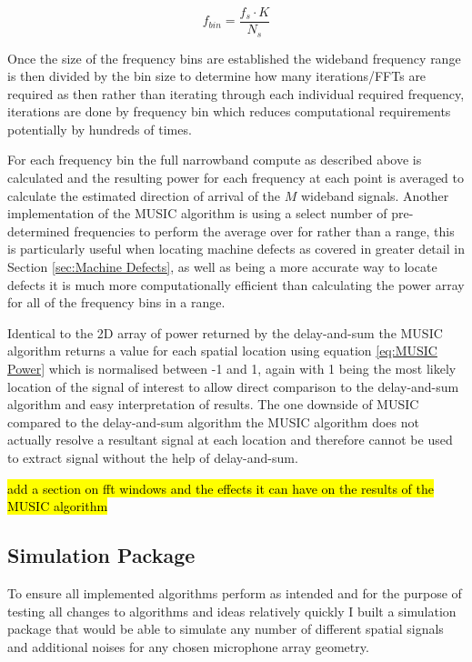 \documentclass{UoNMCHA}
\numberwithin{equation}{section}
\begin{document}
    \begin{equation}
        f_{bin} =\frac{f_s \cdot K}{N_s}
    \end{equation}
    
    Once the size of the frequency bins are established the wideband frequency range is then divided by the bin size to determine how many iterations/FFTs are required as then rather than iterating through each individual required frequency, iterations are done by frequency bin which reduces computational requirements potentially by hundreds of times. 
    
    For each frequency bin the full narrowband compute as described above is calculated and the resulting power for each frequency at each point is averaged to calculate the estimated direction of arrival of the $M$ wideband signals. Another implementation of the MUSIC algorithm is using a select number of pre-determined frequencies to perform the average over for rather than a range, this is particularly useful when locating machine defects as covered in greater detail in Section \ref{sec:Machine Defects}, as well as being a more accurate way to locate defects it is much more computationally efficient than calculating the power array for all of the frequency bins in a range.
    
    Identical to the 2D array of power returned by the delay-and-sum the MUSIC algorithm returns a value for each spatial location using equation \ref{eq:MUSIC Power} which is normalised between -1 and 1, again with 1 being the most likely location of the signal of interest to allow direct comparison to the delay-and-sum algorithm and easy interpretation of results. The one downside of MUSIC compared to the delay-and-sum algorithm the MUSIC algorithm does not actually resolve a resultant signal at each location and therefore cannot be used to extract signal without the help of delay-and-sum. 
    
    \hl{add a section on fft windows and the effects it can have on the results of the MUSIC algorithm}
\subsection{Simulation Package} \label{sec:Software Sim}
    
    To ensure all implemented algorithms perform as intended and for the purpose of testing all changes to algorithms and ideas relatively quickly I built a simulation package that would be able to simulate any number of different spatial signals and additional noises for any chosen microphone array geometry.
    
\end{document}

